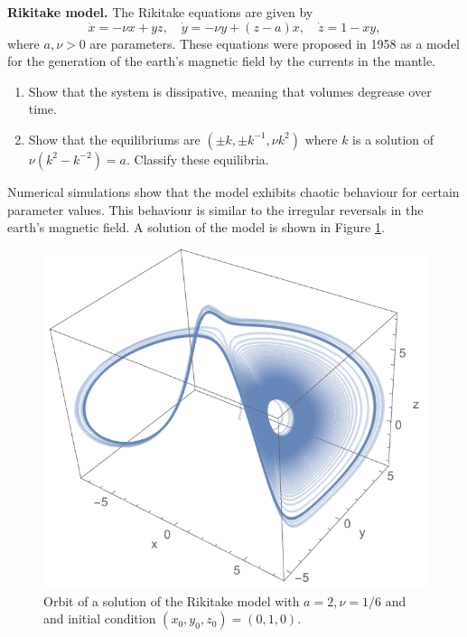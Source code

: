 \documentclass{article}
\begin{document}
\begin{question} \textbf{Rikitake model.} The Rikitake equations are given by
  \begin{equation}
    \dot x = -\nu x + yz,\quad \dot y = -\nu y +(z-a)x, \quad \dot z = 1-xy,
  \end{equation}
where $a,\nu>0$ are parameters. These equations were proposed in 1958 as a model for the generation of the earth's magnetic field by the currents in the mantle.

\begin{enumerate}[label=(\alph*)]
  \item Show that the system is dissipative, meaning that volumes degrease over time.
  \item Show that the equilibriums are $(\pm k, \pm k^{-1},\nu k^2)$ where $k$ is a solution of $\nu(k^2-k^{-2})=a$. Classify these equilibria.
\end{enumerate}

Numerical simulations show that the model exhibits chaotic behaviour for certain parameter values. This behaviour is similar to the irregular reversals in the earth's magnetic field. A solution of the model is shown in Figure \ref{fig:Rikitake}.
\begin{figure}[h]
  \centering
    \includegraphics[scale=.8]{Rikitake}
    \caption{Orbit of a solution of the Rikitake model with $a=2,\nu=1/6$ and and initial condition $(x_0,y_0,z_0)=(0,1,0)$.}
  \label{fig:Rikitake}
\end{figure}

\end{question}
\end{document}
